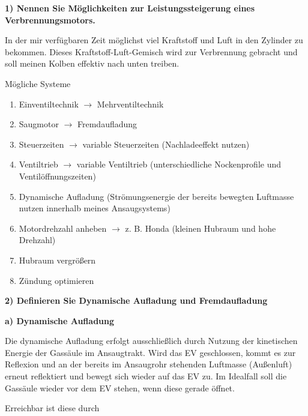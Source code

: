 \textbf{1) Nennen Sie Möglichkeiten zur Leistungssteigerung eines
Verbrennungsmotors.}

In der mir verfügbaren Zeit möglichst viel Kraftstoff und Luft in den
Zylinder zu bekommen. Dieses Kraftstoff-Luft-Gemisch wird zur
Verbrennung gebracht und soll meinen Kolben effektiv nach unten treiben.

Mögliche Systeme

\begin{enumerate}
\item
  Einventiltechnik $\to$ Mehrventiltechnik
\item
  Saugmotor $\to$ Fremdaufladung
\item
  Steuerzeiten $\to$ variable Steuerzeiten (Nachladeeffekt nutzen)
\item
  Ventiltrieb $\to$ variable Ventiltrieb (unterschiedliche
  Nockenprofile und Ventilöffnungszeiten)
\item
  Dynamische Aufladung (Strömungsenergie der bereits bewegten Luftmasse
  nutzen innerhalb meines Ansaugsystems)
\item
  Motordrehzahl anheben $\to$ z. B. Honda (kleinen Hubraum und hohe
  Drehzahl)
\item
  Hubraum vergrößern
\item
  Zündung optimieren
\end{enumerate}

\textbf{2) Definieren Sie Dynamische Aufladung und Fremdaufladung}

\textbf{a) Dynamische Aufladung}

Die dynamische Aufladung erfolgt ausschließlich durch Nutzung der
kinetischen Energie der Gassäule im Ansaugtrakt. Wird das EV
geschlossen, kommt es zur Reflexion und an der bereits im Ansaugrohr
stehenden Luftmasse (Außenluft) erneut reflektiert und bewegt sich
wieder auf das EV zu. Im Idealfall soll die Gassäule wieder vor dem EV
stehen, wenn diese gerade öffnet.

Erreichbar ist diese durch

